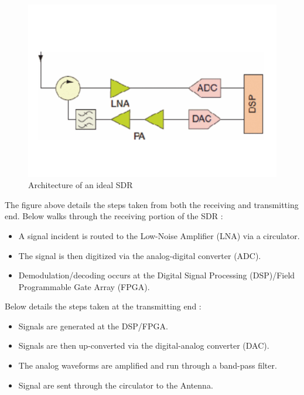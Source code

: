 \documentclass[../main.tex]{subfiles}
\begin{document}
\begin{figure}[H]
    \centering
    \includegraphics{images/sdr.PNG}
    \caption{Architecture of an ideal SDR \cite{sdr_satellite}\cite{sdr_archi}}
    \label{fig:sdr_architecture}
\end{figure}

The figure above details the steps taken from both the receiving and transmitting end. Below walks through the receiving portion of the SDR \cite{sdr_satellite}:

\begin{itemize}
    \item A signal incident is routed to the Low-Noise Amplifier (LNA) via a circulator.
    \item The signal is then digitized via the analog-digital converter (ADC).
    \item Demodulation/decoding occurs at the Digital Signal Processing (DSP)/Field Programmable Gate Array (FPGA).
\end{itemize}

Below details the steps taken at the transmitting end \cite{sdr_satellite}:

\begin{itemize}
    \item Signals are generated at the DSP/FPGA.
    \item Signals are then up-converted via the digital-analog converter (DAC).
    \item The analog waveforms are amplified and run through a band-pass filter.
    \item Signal are sent through the circulator to the Antenna.
\end{itemize}
\end{document}
